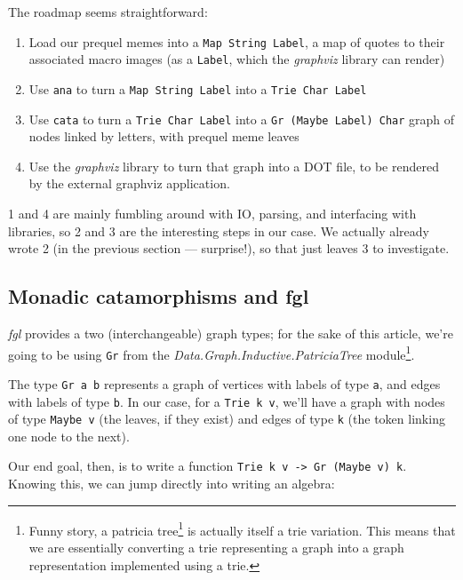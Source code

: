 \documentclass[]{article}
\renewcommand{\href}[2]{#2\footnote{\url{#1}}}
\begin{document}
The roadmap seems straightforward:

\begin{enumerate}
\def\labelenumi{\arabic{enumi}.}
\tightlist
\item
  Load our prequel memes into a \texttt{Map\ String\ Label}, a map of quotes to
  their associated macro images (as a \texttt{Label}, which the \emph{graphviz}
  library can render)
\item
  Use \texttt{ana} to turn a \texttt{Map\ String\ Label} into a
  \texttt{Trie\ Char\ Label}
\item
  Use \texttt{cata} to turn a \texttt{Trie\ Char\ Label} into a
  \texttt{Gr\ (Maybe\ Label)\ Char} graph of nodes linked by letters, with
  prequel meme leaves
\item
  Use the \emph{graphviz} library to turn that graph into a DOT file, to be
  rendered by the external graphviz application.
\end{enumerate}

1 and 4 are mainly fumbling around with IO, parsing, and interfacing with
libraries, so 2 and 3 are the interesting steps in our case. We actually already
wrote 2 (in the previous section --- surprise!), so that just leaves 3 to
investigate.

\hypertarget{monadic-catamorphisms-and-fgl}{%
\subsection{Monadic catamorphisms and fgl}\label{monadic-catamorphisms-and-fgl}}

\emph{fgl} provides a two (interchangeable) graph types; for the sake of this
article, we're going to be using \texttt{Gr} from the
\emph{Data.Graph.Inductive.PatriciaTree} module\footnote{Funny story, a
  \href{http://www.drdobbs.com/architecture-and-design/patricia-tries/208800854}{patricia
  tree} is actually itself a trie variation. This means that we are essentially
  converting a trie representing a graph into a graph representation implemented
  using a trie.}.

The type \texttt{Gr\ a\ b} represents a graph of vertices with labels of type
\texttt{a}, and edges with labels of type \texttt{b}. In our case, for a
\texttt{Trie\ k\ v}, we'll have a graph with nodes of type \texttt{Maybe\ v}
(the leaves, if they exist) and edges of type \texttt{k} (the token linking one
node to the next).

Our end goal, then, is to write a function
\texttt{Trie\ k\ v\ -\textgreater{}\ Gr\ (Maybe\ v)\ k}. Knowing this, we can
jump directly into writing an algebra:
\end{document}

